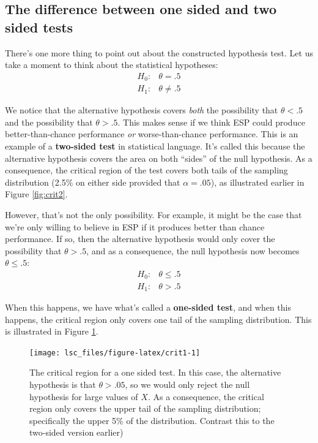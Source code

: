 \documentclass[
  11pt,
  a4paper,
  twoside,symmetric,openright]{book}
\theoremstyle{break}
\theoremstyle{break}
\begin{document}
\subsection{The difference between one sided and two sided tests}\label{onesidedtests}

There's one more thing to point out about the constructed hypothesis test. Let us take a moment to think about the statistical hypotheses:
\[
\begin{array}{cc}
H_0 : & \theta = .5 \\
H_1 : & \theta \neq .5 
\end{array}
\]

We notice that the alternative hypothesis covers \emph{both} the possibility that \(\theta < .5\) and the possibility that \(\theta > .5\). This makes sense if we think ESP could produce better-than-chance performance \emph{or} worse-than-chance performance. This is an example of a \textbf{two-sided test} in statistical language. It's called this because the alternative hypothesis covers the area on both ``sides'' of the null hypothesis. As a consequence, the critical region of the test covers both tails of the sampling distribution (2.5\% on either side provided that \(\alpha =.05\)), as illustrated earlier in Figure \ref{fig:crit2}.

However, that's not the only possibility. For example, it might be the case that we're only willing to believe in ESP if it produces better than chance performance. If so, then the alternative hypothesis would only cover the possibility that \(\theta > .5\), and as a consequence, the null hypothesis now becomes \(\theta \leq .5\):
\[
\begin{array}{cc}
H_0 : & \theta \leq .5 \\
H_1 : & \theta > .5 
\end{array}
\]

When this happens, we have what's called a \textbf{one-sided test}, and when this happens, the critical region only covers one tail of the sampling distribution. This is illustrated in Figure \ref{fig:crit1}.



\begin{figure}

{\centering \texttt{[image: lsc\_files/figure-latex/crit1-1]} 

}

\caption{The critical region for a one sided test. In this case, the alternative hypothesis is that \(\theta > .05\), so we would only reject the null hypothesis for large values of \(X\). As a consequence, the critical region only covers the upper tail of the sampling distribution; specifically the upper 5\% of the distribution. Contrast this to the two-sided version earlier)}\label{fig:crit1}
\end{figure}
\end{document}
